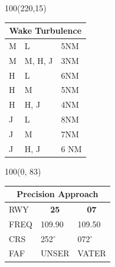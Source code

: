 \documentclass[10pt,landscape,a4paper]{article}
\begin{document}
\begin{textblock}{100}(220,15)
\begin{table}[]
\begin{tabular}{|l|l|l|}
\multicolumn{3}{c}{\textbf{Wake Turbulence}} \\ \hline
 M  & L  & 5NM   \\ \hline
 M  & M, H, J  & 3NM   \\ \hline
 H  & L & 6NM   \\ \hline
 H  & M & 5NM   \\ \hline
 H  & H, J & 4NM \\ \hline
 J &  L & 8NM \\ \hline
 J &  M & 7NM \\ \hline
 J &  H, J  & 6 NM   \\ \hline
\end{tabular}
\end{table}
\end{textblock}


\begin{textblock}{100}(0, 83)
\begin{table}[]
\begin{tabular}{lll}
\multicolumn{3}{c}{\textbf{Precision Approach}} \\ \hline
\multicolumn{1}{|l|}{RWY} & \multicolumn{1}{c|}{\textbf{25}} & \multicolumn{1}{c|}{\textbf{07}} \\ \hline
\multicolumn{1}{|l|}{FREQ} & \multicolumn{1}{l|}{109.90} & \multicolumn{1}{l|}{109.50} \\
\multicolumn{1}{|l|}{CRS} & \multicolumn{1}{l|}{252$^\circ$} & \multicolumn{1}{l|}{072$^\circ$}  \\
\multicolumn{1}{|l|}{FAF} & \multicolumn{1}{l|}{UNSER} & \multicolumn{1}{l|}{VATER}  \\ \hline
\end{tabular}
\end{table}
\end{textblock}
\end{document}
